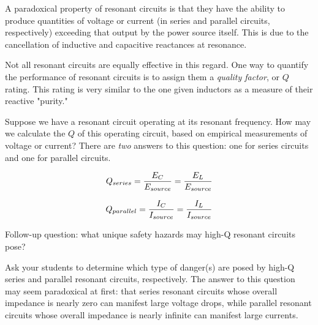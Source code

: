 

A paradoxical property of resonant circuits is that they have the ability to produce quantities of voltage or current (in series and parallel circuits, respectively) exceeding that output by the power source itself.  This is due to the cancellation of inductive and capacitive reactances at resonance.

Not all resonant circuits are equally effective in this regard.  One way to quantify the performance of resonant circuits is to assign them a {\it quality factor}, or $Q$ rating.  This rating is very similar to the one given inductors as a measure of their reactive "purity."

Suppose we have a resonant circuit operating at its resonant frequency.  How may we calculate the $Q$ of this operating circuit, based on empirical measurements of voltage or current?  There are {\it two} answers to this question: one for series circuits and one for parallel circuits.







$$Q_{series} = {E_C \over E_{source}} = {E_L \over E_{source}}$$

$$Q_{parallel} = {I_C \over I_{source}} = {I_L \over I_{source}}$$

\vskip 10pt

Follow-up question: what unique safety hazards may high-Q resonant circuits pose?







Ask your students to determine which type of danger(s) are posed by high-Q series and parallel resonant circuits, respectively.  The answer to this question may seem paradoxical at first: that series resonant circuits whose overall impedance is nearly zero can manifest large voltage drops, while parallel resonant circuits whose overall impedance is nearly infinite can manifest large currents.





